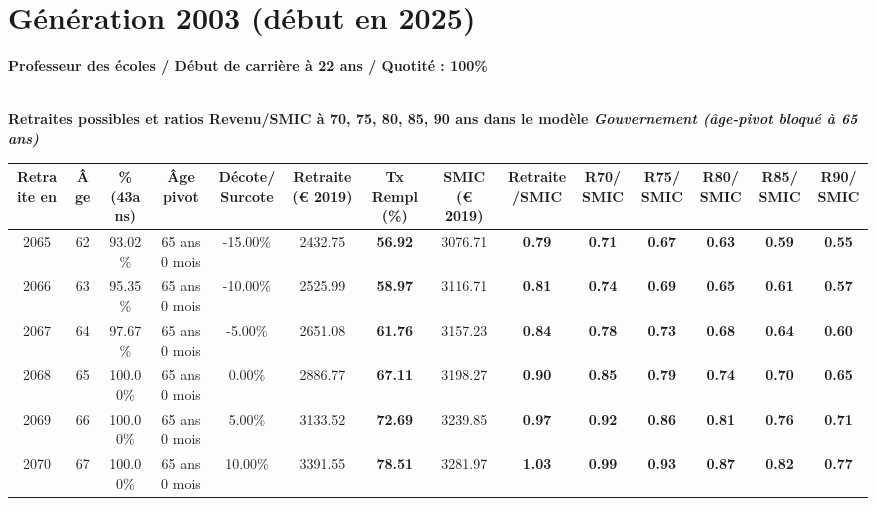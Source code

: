 \newpage 
 
\section{Génération 2003 (début en 2025)\label{ProfEcoles_100_2003_22_0}} 
 
{\bf \noindent Professeur des écoles / Début de carrière à 22 ans / Quotité : 100\%}  ~ 

 ~\\{\bf \noindent Retraites possibles et ratios Revenu/SMIC à 70, 75, 80, 85, 90 ans dans le modèle \emph{Gouvernement (âge-pivot bloqué à 65 ans)}}  
 
\begin{adjustbox}{max width=\textwidth} 
\begin{tabular}[htb]{|c|c||c|c|c||c|c||c|c||c|c|c|c|c|} 
\hline 
 Retraite en &  Âge &  \%(43ans) &  Âge pivot &  Décote/Surcote &  Retraite (\euro{} 2019) &  Tx Rempl(\%) &  SMIC (\euro{} 2019) &  Retraite/SMIC &  R70/SMIC &  R75/SMIC &  R80/SMIC &  R85/SMIC &  R90/SMIC \\ 
\hline \hline 
 2065 &  62 &  93.02\% &  65 ans 0 mois &  -15.00\% &  2432.75 &  {\bf 56.92} &  3076.71 &  {\bf {\color{red} 0.79}} &  {\bf {\color{red} 0.71}} &  {\bf {\color{red} 0.67}} &  {\bf {\color{red} 0.63}} &  {\bf {\color{red} 0.59}} &  {\bf {\color{red} 0.55}} \\ 
\hline 
 2066 &  63 &  95.35\% &  65 ans 0 mois &  -10.00\% &  2525.99 &  {\bf 58.97} &  3116.71 &  {\bf {\color{red} 0.81}} &  {\bf {\color{red} 0.74}} &  {\bf {\color{red} 0.69}} &  {\bf {\color{red} 0.65}} &  {\bf {\color{red} 0.61}} &  {\bf {\color{red} 0.57}} \\ 
\hline 
 2067 &  64 &  97.67\% &  65 ans 0 mois &  -5.00\% &  2651.08 &  {\bf 61.76} &  3157.23 &  {\bf {\color{red} 0.84}} &  {\bf {\color{red} 0.78}} &  {\bf {\color{red} 0.73}} &  {\bf {\color{red} 0.68}} &  {\bf {\color{red} 0.64}} &  {\bf {\color{red} 0.60}} \\ 
\hline 
 2068 &  65 &  100.00\% &  65 ans 0 mois &  0.00\% &  2886.77 &  {\bf 67.11} &  3198.27 &  {\bf {\color{red} 0.90}} &  {\bf {\color{red} 0.85}} &  {\bf {\color{red} 0.79}} &  {\bf {\color{red} 0.74}} &  {\bf {\color{red} 0.70}} &  {\bf {\color{red} 0.65}} \\ 
\hline 
 2069 &  66 &  100.00\% &  65 ans 0 mois &  5.00\% &  3133.52 &  {\bf 72.69} &  3239.85 &  {\bf {\color{red} 0.97}} &  {\bf {\color{red} 0.92}} &  {\bf {\color{red} 0.86}} &  {\bf {\color{red} 0.81}} &  {\bf {\color{red} 0.76}} &  {\bf {\color{red} 0.71}} \\ 
\hline 
 2070 &  67 &  100.00\% &  65 ans 0 mois &  10.00\% &  3391.55 &  {\bf 78.51} &  3281.97 &  {\bf 1.03} &  {\bf {\color{red} 0.99}} &  {\bf {\color{red} 0.93}} &  {\bf {\color{red} 0.87}} &  {\bf {\color{red} 0.82}} &  {\bf {\color{red} 0.77}} \\ 
\hline 
\hline 
\end{tabular} 
\end{adjustbox} 
 
